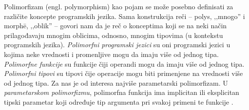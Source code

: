 Polimorfizam (engl. polymorphism) kao pojam se može posebno definisati za različite koncepte programskih jezika. Sama konstrukcija reči -- polys, ‚‚mnogo'' i morph\={e}, ‚‚oblik'' -- govori nam da je reč o konceptima koji se na neki način prilagođavaju mnogim oblicima, odnosno, mnogim tipovima (u kontekstu programskih jezika). \textit{Polimorfni programski jezici} su oni programski jezici u kojima neke vrednosti i promenljive mogu da imaju više od jednog tipa. \textit{Polimorfne funkcije} su funkcije čiji operandi mogu da imaju više od jednog tipa. \textit{Polimorfni tipovi} su tipovi čije operacije mogu biti primenjene na vrednosti više od jednog tipa. Za nas je od interesa najviše parametarski polimorfizam. U \textit{parametarskom polimorfizmu}, polimorfna funkcija ima implicitan ili eksplicitan tipski parametar koji određuje tip argumenta pri svakoj primeni te funkcije \cite{On-Understanding-Types-Data-Abstraction-and-Polymorphism}.